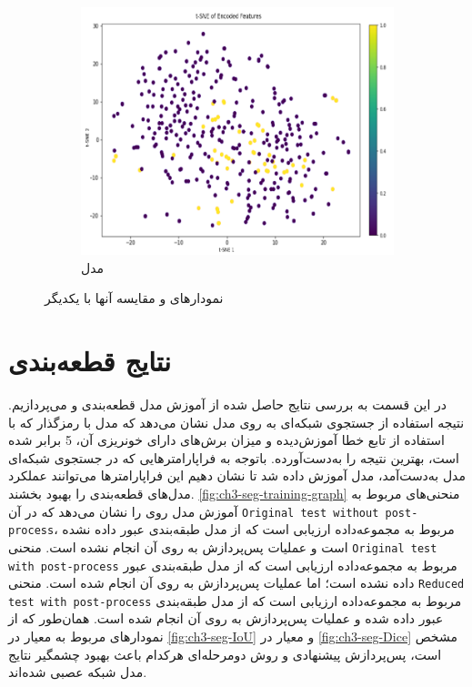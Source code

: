 \begin{figure}[h!]
\begin{subfigure}{0.33\textwidth}
			\includegraphics[width=\linewidth]{Images/Chapter3/tsne-other.png}
			\caption{مدل  
			\cite{Ganeshkumar2022Identification}}
			\label{fig:ch3-tsne-other}
        \end{subfigure}
		\caption{نمودارهای 
		و مقایسه آنها با یکدیگر}
		\label{fig:ch3-tsne}
\end{figure}


\section{نتایج قطعه‌بندی}
در این قسمت به بررسی نتایج حاصل شده از آموزش مدل قطعه‌بندی 
و 
 می‌پردازیم. نتیجه استفاده از جستجوی شبکه‌ای به روی مدل 
 نشان می‌دهد که مدل با رمزگذار 
که با استفاده از تابع خطا
آموزش‌دیده و میزان برش‌های دارای خونریزی آن، 5 برابر شده است، بهترین نتیجه را به‌دست‌آورده‌. باتوجه به فراپارامتر‌هایی که در جستجوی شبکه‌ای مدل
 به‌دست‌آمد، مدل
 آموزش داده شد تا نشان دهیم این فراپارامترها می‌توانند عملکرد مدل‌های قطعه‌بندی را بهبود بخشند. 
 \autoref{fig:ch3-seg-training-graph}
 منحنی‌های مربوط به آموزش مدل روی 
را نشان می‌دهد که در آن 
 \texttt{Original test without post-process}،
 مربوط به مجموعه‌داده ارزیابی است که از مدل طبقه‌بندی عبور داده نشده است و عملیات پس‌پردازش به روی آن انجام نشده است.
 منحنی 
 \texttt{Original test with post-process}
 مربوط به مجموعه‌داده ارزیابی است که از مدل طبقه‌بندی عبور داده نشده‌ است؛ اما عملیات پس‌پردازش به روی آن انجام شده است.
منحنی 
 \texttt{Reduced test with post-process}
 مربوط به مجموعه‌داده ارزیابی است که از مدل طبقه‌بندی عبور داده شده و عملیات پس‌پردازش به روی آن انجام شده است.
 همان‌طور که از نمودارهای مربوط به معیار
 در 
 \autoref{fig:ch3-seg-IoU}
 و معیار 
  در 
  \autoref{fig:ch3-seg-Dice}
  مشخص است،‌ پس‌پردازش پیشنهادی و روش دومرحله‌ای هرکدام باعث بهبود چشمگیر نتایج مدل شبکه عصبی شده‌اند.
 
